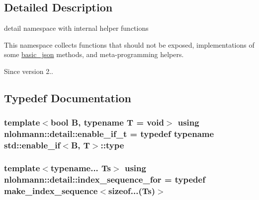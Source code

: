 \subsection{Detailed Description}
detail namespace with internal helper functions 

This namespace collects functions that should not be exposed, implementations of some \hyperlink{classnlohmann_1_1basic__json}{basic\+\_\+json} methods, and meta-\/programming helpers.

\begin{DoxySince}{Since}
version 2.. 
\end{DoxySince}


\subsection{Typedef Documentation}
\subsubsection[{\texorpdfstring{enable\+\_\+if\+\_\+t}{enable_if_t}}]{\setlength{\rightskip}{0pt plus 5cm}template$<$bool B, typename T  = void$>$ using {\bf nlohmann\+::detail\+::enable\+\_\+if\+\_\+t} = typedef typename std\+::enable\+\_\+if$<$B, T$>$\+::type}\hypertarget{namespacenlohmann_1_1detail_a02bcbc878bee413f25b985ada771aa9c}{}\label{namespacenlohmann_1_1detail_a02bcbc878bee413f25b985ada771aa9c}
\subsubsection[{\texorpdfstring{index\+\_\+sequence\+\_\+for}{index_sequence_for}}]{\setlength{\rightskip}{0pt plus 5cm}template$<$typename... Ts$>$ using {\bf nlohmann\+::detail\+::index\+\_\+sequence\+\_\+for} = typedef {\bf make\+\_\+index\+\_\+sequence}$<$sizeof...(Ts)$>$}\hypertarget{namespacenlohmann_1_1detail_a24800493c6ec02ce033dcbb47b7fd28e}{}\label{namespacenlohmann_1_1detail_a24800493c6ec02ce033dcbb47b7fd28e}
